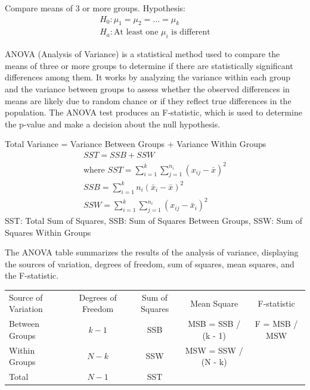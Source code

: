 \documentclass[answers,12pt,addpoints]{exam}
\begin{document}
\begin{remark}
    Compare means of 3 or more groups. Hypothesis:
\begin{align*}
    H_0: \mu_1 = \mu_2 = \ldots = \mu_k \\
    H_a: \text{At least one } \mu_i \text{ is different}
\end{align*}
\end{remark}

\begin{definition}
    ANOVA (Analysis of Variance) is a statistical method used to compare the means of three or more groups to determine if there are statistically significant differences among them. It works by analyzing the variance within each group and the variance between groups to assess whether the observed differences in means are likely due to random chance or if they reflect true differences in the population. The ANOVA test produces an F-statistic, which is used to determine the p-value and make a decision about the null hypothesis.

    Total Variance = Variance Between Groups + Variance Within Groups
    \begin{align*}
    SST = SSB + SSW \\
    \text{where } SST = \sum_{i=1}^{k} \sum_{j=1}^{n_i} (x_{ij} - \bar{x})^2 \\
    SSB = \sum_{i=1}^{k} n_i (\bar{x}_i - \bar{x})^2 \\
    SSW = \sum_{i=1}^{k} \sum_{j=1}^{n_i} (x_{ij} - \bar{x}_i)^2
    \end{align*}
    SST: Total Sum of Squares, SSB: Sum of Squares Between Groups, SSW: Sum of Squares Within Groups
\end{definition}

\begin{remark}
    The ANOVA table summarizes the results of the analysis of variance, displaying the sources of variation, degrees of freedom, sum of squares, mean squares, and the F-statistic.\\
    \small
\begin{tabular}{lcccc}
Source of Variation & Degrees of Freedom & Sum of Squares & Mean Square & F-statistic \\
Between Groups & $k - 1$ & SSB & MSB = SSB / (k - 1) & F = MSB / MSW \\
Within Groups & $N - k$ & SSW & MSW = SSW / (N - k) & \\
Total & $N - 1$ & SST & & \\
\end{tabular}
\normalsize
\end{remark}
\end{document}

